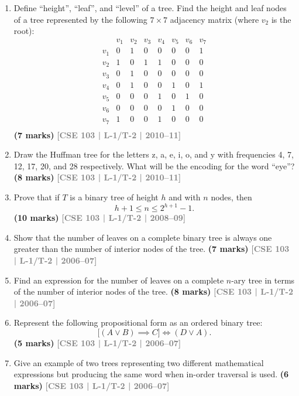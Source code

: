 \documentclass[12pt,a3paper]{article}
\newcommand{\yr}[1]{\hfill\textcolor{gray}{\small\textbf{[#1]}}}
\newcommand{\mk}[1]{\textcolor{orange!70!black}{\small\textbf{(#1 marks)}}}
\begin{document}
\begin{enumerate}
\begin{center}
    \vspace{1.5em}
    ``A saturated hydrocarbon tree T''
\end{center}

\mk{8} \yr{CSE 103 | L-1/T-2 | 2010--11}

\item Define ``height'', ``leaf'', and ``level'' of a tree. Find the height and leaf nodes of a tree represented by the following $7 \times 7$ adjacency matrix (where $v_2$ is the root):
\[
\begin{array}{c|ccccccc}
  & v_1 & v_2 & v_3 & v_4 & v_5 & v_6 & v_7 \\\hline
v_1 & 0 & 1 & 0 & 0 & 0 & 0 & 1 \\
v_2 & 1 & 0 & 1 & 1 & 0 & 0 & 0 \\
v_3 & 0 & 1 & 0 & 0 & 0 & 0 & 0 \\
v_4 & 0 & 1 & 0 & 0 & 1 & 0 & 1 \\
v_5 & 0 & 0 & 0 & 1 & 0 & 1 & 0 \\
v_6 & 0 & 0 & 0 & 0 & 1 & 0 & 0 \\
v_7 & 1 & 0 & 0 & 1 & 0 & 0 & 0 \\
\end{array}
\]
\mk{7} \yr{CSE 103 | L-1/T-2 | 2010--11}

\item Draw the Huffman tree for the letters z, a, e, i, o, and y with frequencies 4, 7, 12, 17, 20, and 28 respectively. What will be the encoding for the word ``eye''?
\mk{8} \yr{CSE 103 | L-1/T-2 | 2010--11}

\item Prove that if $T$ is a binary tree of height $h$ and with $n$ nodes, then
\[
  h + 1 \leq n \leq 2^{h+1} - 1.
\]
\mk{10} \yr{CSE 103 | L-1/T-2 | 2008--09}

\item Show that the number of leaves on a complete binary tree is always one greater than the number of interior nodes of the tree.
\mk{7} \yr{CSE 103 | L-1/T-2 | 2006--07}

\item Find an expression for the number of leaves on a complete $n$-ary tree in terms of the number of interior nodes of the tree.
\mk{8} \yr{CSE 103 | L-1/T-2 | 2006--07}

\item Represent the following propositional form as an ordered binary tree:
\[
  \bigl[(A \lor B) \implies C\bigr] \iff (D \lor A).
\]
\mk{5} \yr{CSE 103 | L-1/T-2 | 2006--07}

\item Give an example of two trees representing two different mathematical expressions but producing the same word when in-order traversal is used.
\mk{6} \yr{CSE 103 | L-1/T-2 | 2006--07}



\end{enumerate}
\end{document}
